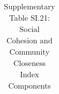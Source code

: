 \begin{longtable}{llcccccccccc}
\caption{Supplementary Table SI.21: Social Cohesion and Community Closeness Index Components} \label{tab:pap__c2_3_b} \\                                                                                                                                                                                                                                                                                                                                                                                                                                                                                                                                                                                                                                                                                                                                                                  
\hline \hline                                                                                                                                                                                                                                                                                                                                                                                                                                                                                                                                                                                                                                                                                                                                                                                                                                                                             

\end{longtable}
